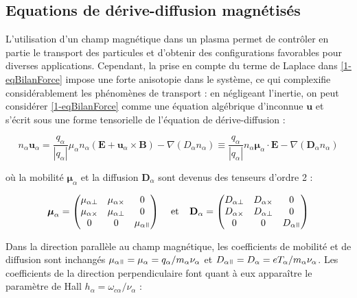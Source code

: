\begin{refsection}
\subsection{Equations de dérive-diffusion magnétisés}
L'utilisation d'un champ magnétique dans un plasma permet de contrôler en partie
le transport des particules et d'obtenir des configurations favorables pour
diverses applications. Cependant, la prise en compte du terme de Laplace dans
\eqref{1-eqBilanForce} impose une forte anisotopie dans le système, ce qui
complexifie considérablement les phénomènes de transport : en
négligeant l'inertie, on peut considérer \eqref{1-eqBilanForce} comme une
équation algébrique d'inconnue $\mathbf u$ et s'écrit sous une forme
tensorielle de l'équation de dérive-diffusion :

\begin{equation}
\label{1-eqDriftDif}
n_\alpha\mathbf u_\alpha=\frac{q_\alpha}{|q_\alpha|}\mu_\alpha
n_\alpha\left(\mathbf E+\mathbf u_\alpha\times\mathbf
B\right)-\nabla\left(D_\alpha n_\alpha\right)\equiv
\frac{q_\alpha}{|q_\alpha|} n_\alpha\boldsymbol{\mu}_\alpha\cdot \mathbf
E-{\nabla\left(\mathbf{D}_\alpha n_\alpha\right)}
\end{equation}

où la mobilité $\boldsymbol{\mu}_\alpha$ et la diffusion $\mathbf{D}_\alpha$
sont devenus des tenseurs d'ordre 2 :

\begin{align}
\boldsymbol{\mu}_\alpha =
 \begin{pmatrix}
  \mu_{\alpha\perp} & \mu_{\alpha\times} & 0 \\
  \mu_{\alpha\times} & \mu_{\alpha\perp} & 0 \\
  0  & 0  & \mu_{\alpha\para} 
 \end{pmatrix}\;\;\;\;\text{et}\;\;\;\;
 \mathbf D_\alpha =
 \begin{pmatrix}
  D_{\alpha\perp} & D_{\alpha\times} & 0 \\
  D_{\alpha\times} & D_{\alpha\perp} & 0 \\
  0  & 0  & D_{\alpha\para} 
 \end{pmatrix}
\end{align}

Dans la direction parallèle au champ magnétique, les coefficients de mobilité et
de diffusion sont inchangés
$\mu_{\alpha\para}=\mu_{\alpha}=q_\alpha/m_\alpha\nu_\alpha$ et
$D_{\alpha\para}=D_\alpha=eT_\alpha/m_\alpha\nu_\alpha$. Les coefficients de la
direction perpendiculaire font quant à eux apparaître le paramètre de Hall
$h_\alpha=\omega_{c\alpha}/\nu_\alpha$ :


\end{refsection}
